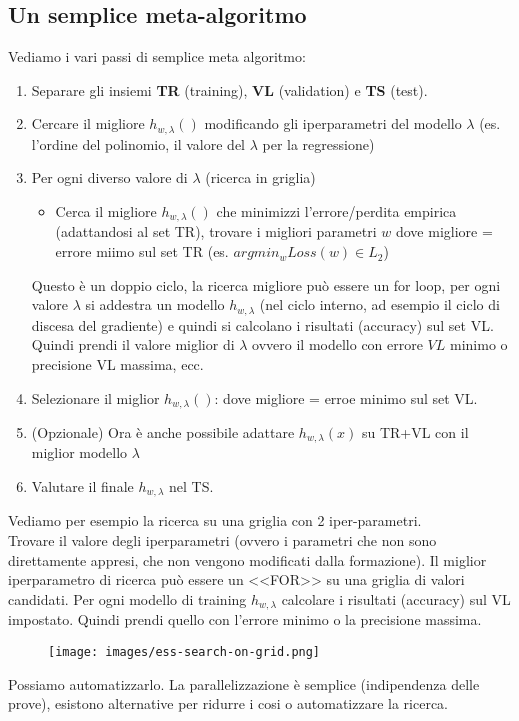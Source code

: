 \subsection{Un semplice meta-algoritmo}
Vediamo i vari passi di semplice meta algoritmo:
\begin{enumerate}
    \item Separare gli insiemi \textbf{TR} (training), \textbf{VL} (validation) e \textbf{TS} (test).
    \item Cercare il migliore $h_{w,\lambda}()$ modificando gli iperparametri del modello $\lambda$ (es. l'ordine del polinomio, il valore del $\lambda$ per la regressione)
    \item Per ogni diverso valore di $\lambda$ (ricerca in griglia)
    \begin{itemize}
        \item Cerca il migliore $h_{w,\lambda}()$ che minimizzi l'errore/perdita empirica (adattandosi al set TR), trovare i migliori parametri $w$ dove migliore = errore miimo sul set TR (es. $argmin_w Loss(w) \in L_2$) 
    \end{itemize}
    Questo è un doppio ciclo, la ricerca migliore può essere un for loop, per ogni valore $\lambda$ si addestra un modello $h_{w,\lambda}$ (nel ciclo interno, ad esempio il ciclo di discesa del gradiente) e quindi si calcolano i risultati (accuracy) sul set VL.
    Quindi prendi il valore miglior di $\lambda$ ovvero il modello con errore $VL$ minimo o precisione VL massima, ecc.
    \item Selezionare il miglior $h_{w, \lambda}()$: dove migliore = erroe minimo sul set VL.
    \item (Opzionale) Ora è anche possibile adattare $h_{w, \lambda}(x)$ su TR+VL con il miglior modello $\lambda$
    \item Valutare il finale $h_{w, \lambda}$ nel TS.  
\end{enumerate}

\begin{example}
    Vediamo per esempio la ricerca su una griglia con 2 iper-parametri.\\
    Trovare il valore degli iperparametri (ovvero i parametri che non sono direttamente appresi, che non vengono modificati dalla formazione). Il miglior
    iperparametro di ricerca può essere un <<FOR>> su una griglia di valori candidati. Per ogni modello di training $h_{w, \lambda}$ calcolare i risultati (accuracy) sul VL impostato. 
    Quindi prendi quello con l'errore minimo o la precisione massima.
    \begin{figure}[h!]
        \centering
        \texttt{[image: images/ess-search-on-grid.png]}
    \end{figure}

    \hspace{-15pt}Possiamo automatizzarlo. La parallelizzazione è semplice (indipendenza delle prove), esistono alternative
    per ridurre i cosi o automatizzare la ricerca.
\end{example}

